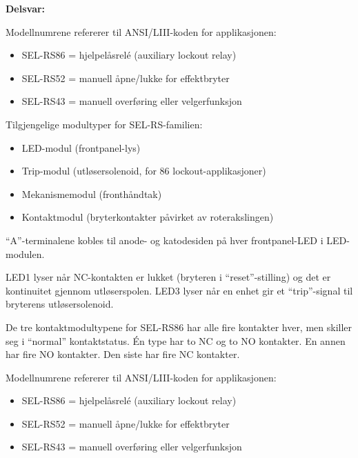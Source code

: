





\noindent
{\bf Delsvar:}

\vskip 10pt

Modellnumrene refererer til ANSI/LIII-koden for applikasjonen:

\begin{itemize}
\item{} SEL-RS86 = hjelpelåsrelé (auxiliary lockout relay)
\item{} SEL-RS52 = manuell åpne/lukke for effektbryter
\item{} SEL-RS43 = manuell overføring eller velgerfunksjon
\end{itemize}








Tilgjengelige modultyper for SEL-RS-familien:

\begin{itemize}
\item{} LED-modul (frontpanel-lys)
\item{} Trip-modul (utløsersolenoid, for 86 lockout-applikasjoner)
\item{} Mekanismemodul (fronthåndtak)
\item{} Kontaktmodul (bryterkontakter påvirket av roterakslingen)
\end{itemize}

\vskip 10pt

``A''-terminalene kobles til anode- og katodesiden på hver frontpanel-LED i LED-modulen.

\vskip 10pt

LED1 lyser når NC-kontakten er lukket (bryteren i ``reset''-stilling) og det er kontinuitet gjennom utløserspolen. LED3 lyser når en enhet gir et ``trip''-signal til bryterens utløsersolenoid.

\vskip 10pt

De tre kontaktmodultypene for SEL-RS86 har alle fire kontakter hver, men skiller seg i ``normal'' kontaktstatus. Én type har to NC og to NO kontakter. En annen har fire NO kontakter. Den siste har fire NC kontakter.

\vskip 10pt

Modellnumrene refererer til ANSI/LIII-koden for applikasjonen:

\begin{itemize}
\item{} SEL-RS86 = hjelpelåsrelé (auxiliary lockout relay)
\item{} SEL-RS52 = manuell åpne/lukke for effektbryter
\item{} SEL-RS43 = manuell overføring eller velgerfunksjon
\end{itemize}



